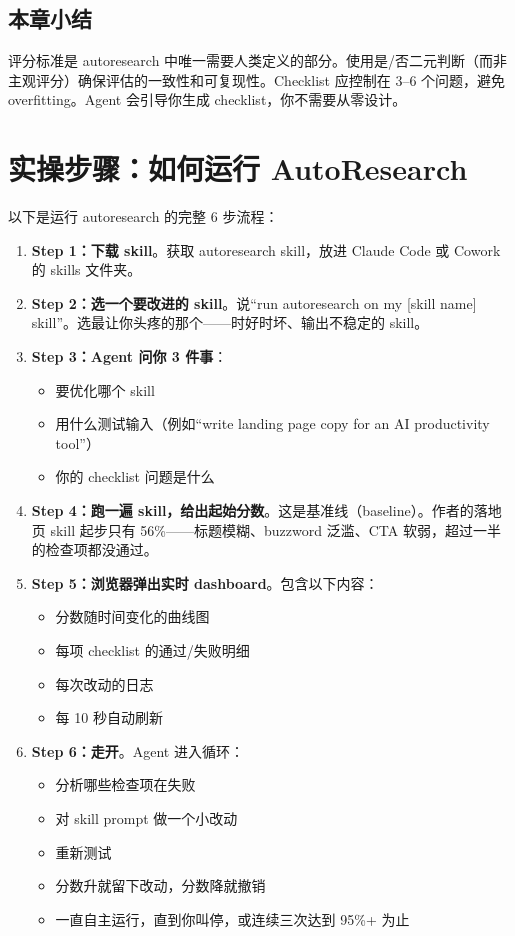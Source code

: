 \documentclass[a4paper]{article}
\begin{document}
\subsection{本章小结}

评分标准是 autoresearch 中唯一需要人类定义的部分。使用是/否二元判断（而非主观评分）确保评估的一致性和可复现性。Checklist 应控制在 3--6 个问题，避免 overfitting。Agent 会引导你生成 checklist，你不需要从零设计。

\section{实操步骤：如何运行 AutoResearch}

以下是运行 autoresearch 的完整 6 步流程：

\begin{enumerate}
    \item \textbf{Step 1：下载 skill}。获取 autoresearch skill，放进 Claude Code 或 Cowork 的 skills 文件夹。

    \item \textbf{Step 2：选一个要改进的 skill}。说``run autoresearch on my [skill name] skill''。选最让你头疼的那个——时好时坏、输出不稳定的 skill。

    \item \textbf{Step 3：Agent 问你 3 件事}：
    \begin{itemize}
        \item 要优化哪个 skill
        \item 用什么测试输入（例如``write landing page copy for an AI productivity tool''）
        \item 你的 checklist 问题是什么
    \end{itemize}

    \item \textbf{Step 4：跑一遍 skill，给出起始分数}。这是基准线（baseline）。作者的落地页 skill 起步只有 56\%——标题模糊、buzzword 泛滥、CTA 软弱，超过一半的检查项都没通过。

    \item \textbf{Step 5：浏览器弹出实时 dashboard}。包含以下内容：
    \begin{itemize}
        \item 分数随时间变化的曲线图
        \item 每项 checklist 的通过/失败明细
        \item 每次改动的日志
        \item 每 10 秒自动刷新
    \end{itemize}

    \item \textbf{Step 6：走开}。Agent 进入循环：
    \begin{itemize}
        \item 分析哪些检查项在失败
        \item 对 skill prompt 做一个小改动
        \item 重新测试
        \item 分数升就留下改动，分数降就撤销
        \item 一直自主运行，直到你叫停，或连续三次达到 95\%+ 为止
    \end{itemize}
\end{enumerate}
\end{document}
